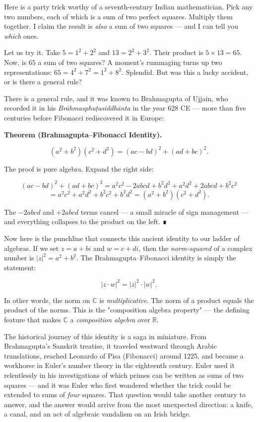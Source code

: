 

Here is a party trick worthy of a seventh-century Indian mathematician. Pick any two numbers, each of which is a sum of two perfect squares. Multiply them together. I claim the result is \textit{also} a sum of two squares --- and I can tell you \textit{which} ones.

Let us try it. Take $5 = 1^2 + 2^2$ and $13 = 2^2 + 3^2$. Their product is $5 \times 13 = 65$. Now, is $65$ a sum of two squares? A moment's rummaging turns up two representations: $65 = 4^2 + 7^2 = 1^2 + 8^2$. Splendid. But was this a lucky accident, or is there a general rule?

There is a general rule, and it was known to Brahmagupta of Ujjain, who recorded it in his \textit{Brāhmasphuṭasiddhānta} in the year 628 CE --- more than five centuries before Fibonacci rediscovered it in Europe:

\textbf{Theorem (Brahmagupta--Fibonacci Identity).}

\[(a^2 + b^2)(c^2 + d^2) = (ac - bd)^2 + (ad + bc)^2.\]

The proof is pure algebra. Expand the right side:

\[(ac - bd)^2 + (ad + bc)^2 = a^2c^2 - 2abcd + b^2d^2 + a^2d^2 + 2abcd + b^2c^2\]
\[= a^2c^2 + a^2d^2 + b^2c^2 + b^2d^2 = (a^2 + b^2)(c^2 + d^2).\]

The $-2abcd$ and $+2abcd$ terms cancel --- a small miracle of sign management --- and everything collapses to the product on the left. ∎


Now here is the punchline that connects this ancient identity to our ladder of algebras. If we set $z = a + bi$ and $w = c + di$, then the \textit{norm-squared} of a complex number is $|z|^2 = a^2 + b^2$. The Brahmagupta--Fibonacci identity is simply the statement:

\[|z \cdot w|^2 = |z|^2 \cdot |w|^2.\]

In other words, the norm on $\mathbb{C}$ is \textit{multiplicative}. The norm of a product equals the product of the norms. This is the "composition algebra property" --- the defining feature that makes $\mathbb{C}$ a \textit{composition algebra} over $\mathbb{R}$.

The historical journey of this identity is a saga in miniature. From Brahmagupta's Sanskrit treatise, it traveled westward through Arabic translations, reached Leonardo of Pisa (Fibonacci) around 1225, and became a workhorse in Euler's number theory in the eighteenth century. Euler used it relentlessly in his investigations of which primes can be written as sums of two squares --- and it was Euler who first wondered whether the trick could be extended to sums of \textit{four} squares. That question would take another century to answer, and the answer would arrive from the most unexpected direction: a knife, a canal, and an act of algebraic vandalism on an Irish bridge.


